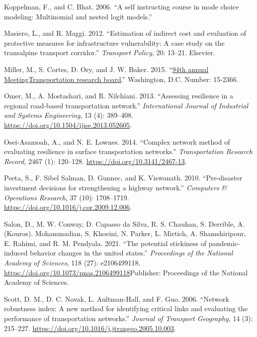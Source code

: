 \documentclass[]{ascelike-new}
\newlength{\cslhangindent}
\newenvironment{CSLReferences}[2] %
 {\begin{list}{}{%
  \setlength{\itemindent}{0pt}
  \setlength{\leftmargin}{0pt}
  \setlength{\parsep}{0pt}
  \ifodd #1
   \setlength{\leftmargin}{\cslhangindent}
   \setlength{\itemindent}{-1\cslhangindent}
  \fi
  \setlength{\itemsep}{#2\baselineskip}}}
 {\end{list}}
\begin{document}
\begin{CSLReferences}{1}{0}
Koppelman, F., and C. Bhat. 2006. {``A self instructing course in mode
choice modeling: Multinomial and nested logit models.''}

Masiero, L., and R. Maggi. 2012. {``Estimation of indirect cost and
evaluation of protective measures for infrastructure vulnerability: A
case study on the transalpine transport corridor.''} \emph{Transport
Policy}, 20: 13--21. Elsevier.

Miller, M., S. Cortes, D. Ory, and J. W. Baker. 2015.
{``\href{https://trid.trb.org/View/1337593}{94th annual
MeetingTransportation research board}.''} Washington, D.C. Number:
15-2366.

Omer, M., A. Mostashari, and R. Nilchiani. 2013. {``Assessing resilience
in a regional road-based transportation network.''} \emph{International
Journal of Industrial and Systems Engineering}, 13 (4): 389--408.
\url{https://doi.org/10.1504/ijise.2013.052605}.

Osei-Asamoah, A., and N. E. Lownes. 2014. {``Complex network method of
evaluating resilience in surface transportation networks.''}
\emph{Transportation Research Record}, 2467 (1): 120--128.
\url{https://doi.org/10.3141/2467-13}.

Peeta, S., F. Sibel Salman, D. Gunnec, and K. Viswanath. 2010.
{``Pre-disaster investment decisions for strengthening a highway
network.''} \emph{Computers \& Operations Research}, 37 (10):
1708--1719. \url{https://doi.org/10.1016/j.cor.2009.12.006}.

Salon, D., M. W. Conway, D. Capasso da Silva, R. S. Chauhan, S.
Derrible, A. (Kouros). Mohammadian, S. Khoeini, N. Parker, L. Mirtich,
A. Shamshiripour, E. Rahimi, and R. M. Pendyala. 2021. {``The potential
stickiness of pandemic-induced behavior changes in the united states.''}
\emph{Proceedings of the National Academy of Sciences}, 118 (27):
e2106499118. \url{https://doi.org/10.1073/pnas.2106499118}Publisher:
Proceedings of the National Academy of Sciences.

Scott, D. M., D. C. Novak, L. Aultman-Hall, and F. Guo. 2006. {``Network
robustness index: A new method for identifying critical links and
evaluating the performance of transportation networks.''} \emph{Journal
of Transport Geography}, 14 (3): 215--227.
\url{https://doi.org/10.1016/j.jtrangeo.2005.10.003}.


\end{CSLReferences}
\end{document}
